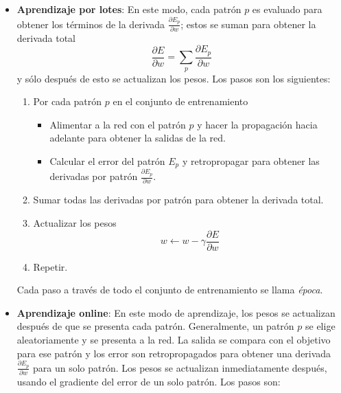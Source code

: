 \begin{itemize}
    \item \textbf{Aprendizaje por lotes}: En este modo, cada patrón $p$ es evaluado para obtener los términos de la derivada $\frac{\partial E_p}{\partial w}$; estos se suman para obtener la derivada total
    \[
      \frac{\partial E}{\partial w}  = \sum_p \frac{\partial E_p}{\partial w} 
    \]
    y sólo después de esto se actualizan los pesos. Los pasos son los siguientes:
    
    \begin{enumerate}
        \item Por cada patrón $p$ en el conjunto de entrenamiento
            \begin{itemize}
                \item Alimentar a la red con el patrón $p$ y hacer la propagación hacia adelante para obtener la salidas de la red.
                \item Calcular el error del patrón $E_p$ y retropropagar para obtener 
                las derivadas por patrón $\frac{\partial E_p}{\partial w}$.
            \end{itemize}
        \item Sumar todas las derivadas por patrón para obtener la derivada total.
        \item Actualizar los pesos
        \[
            w \leftarrow w - \gamma \frac{\partial E}{\partial w}
        \]
        \item Repetir.
    \end{enumerate}
    
    Cada paso a través de todo el conjunto de entrenamiento se llama \textit{época}.
    
    \item \textbf{Aprendizaje online}: En este modo de aprendizaje, los pesos
    se actualizan después de que se presenta cada patrón. Generalmente, un patrón $p$ se
    elige aleatoriamente y se presenta a la red. La salida se compara con el objetivo
    para ese patrón y los error son retropropagados para obtener una
    derivada $\frac{\partial E_p}{\partial w}$  para un solo patrón. Los pesos se actualizan
    inmediatamente después, usando el gradiente del error de un solo patrón.
    Los pasos son:
    

\end{itemize}
